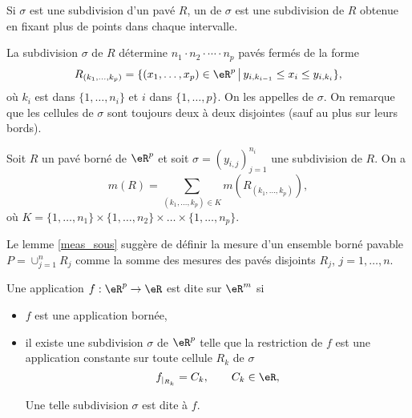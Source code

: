 
\begin{definition}
	Si $\sigma$ est une subdivision d'un pavé $R$, un  de $\sigma$ est une subdivision de $R$ obtenue en fixant plus de points dans chaque intervalle.
\end{definition}

La subdivision $\sigma$ de $R$ détermine $n_1\cdot n_2\cdot\cdots\cdot n_p$ pavés fermés de la forme 
\[
R_{(k_1,\ldots,k_p)}=\{(x_1,\ldots, x_p)\in\eR^p\,\big\vert\, y_{i,k_{i-1}}\leq x_i\leq y_{i,k_i}\},
\]
où $k_i$ est dans $\{1,\ldots, n_i\}$ et $i$ dans $\{1,\ldots, p\}$. On les appelles  de $\sigma$. On remarque que les cellules de $\sigma$ sont toujours deux à deux disjointes (sauf au plus sur leurs bords). 
\begin{lemma}\label{meas_sous}
	Soit $R$ un pavé borné de $\eR^p$ et soit $\sigma=(y_{i,j})_{j=1}^{n_i}$ une subdivision de $R$. 
On a 
\[
m(R)=\sum_{(k_1,\ldots,k_p)\in K} m(R_{(k_1,\ldots,k_p)}),
\] 
où $K=\{1,\ldots,n_1\}\times\{1,\ldots,n_2\}\times\ldots \times\{1,\ldots,n_p\}$.
\end{lemma}
Le lemme \ref{meas_sous} suggère de définir la mesure d'un ensemble borné pavable $P=\cup_{j=1}^{n}R_j$ comme la somme des mesures des pavés disjoints $R_j$, $j=1,\ldots, n$.
\begin{definition}
Une application $f:\eR^p\to\eR$ est dite  sur $\eR^m$ si
  \begin{itemize}
  \item $f$ est une application bornée,
\item il existe une subdivision $\sigma$ de $\eR^p$ telle que la restriction de $f$  est une application constante sur toute cellule $R_k$ de $\sigma$
\[
f_{\vert_{R_k}}=C_k, \qquad C_k\in\eR,
\]
 
Une telle subdivision $\sigma$ est dite  à $f$. 
  \end{itemize}
\end{definition} 
